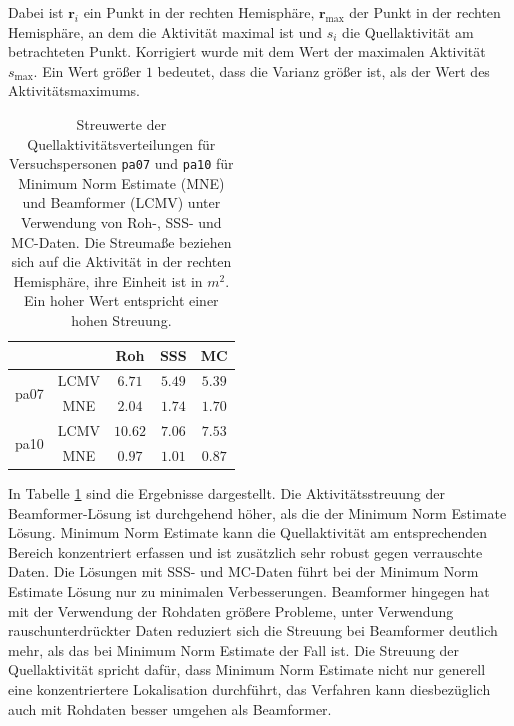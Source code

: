 \documentclass[doc,a4paper,12pt]{apa6}
\newcommand{\mx}[1]{\mathbf{#1}}
\renewcommand{\arraystretch}{1.2}
\begin{document}
Dabei ist $\mx{r}_i$ ein Punkt in der rechten Hemisphäre, $\mx{r}_{\text{max}}$ der Punkt in der rechten Hemisphäre, an dem die Aktivität maximal ist und $s_i$ die Quellaktivität am betrachteten Punkt. Korrigiert wurde mit dem Wert der maximalen Aktivität $s_{\text{max}}$. Ein Wert größer $1$ bedeutet, dass die Varianz größer ist, als der Wert des Aktivitätsmaximums.

\begin{table}[t]
  \caption{}
  \label{tab:distribution}
  \vspace*{3mm}
  \centering
  \setlength{\tabcolsep}{1cm}
  \renewcommand{\arraystretch}{1.5}
  \begin{tabular}{ccccc}
  \hline
  & & Roh & SSS & MC\\
  \hline
  \multirow{2}{*}{pa07} & LCMV & $6.71$ & $5.49$ & $5.39$\\
  & MNE & $2.04$ & $1.74$ & $1.70$\\
  \hline
  \multirow{2}{*}{pa10} & LCMV & $10.62$ & $7.06$ & $7.53$\\
  & MNE & $0.97$ & $1.01$ & $0.87$\\
  \hline
  \end{tabular}
  \vspace*{3mm}
  \caption*{Streuwerte der Quellaktivitätsverteilungen für Versuchspersonen \texttt{pa07} und \texttt{pa10} für Minimum Norm Estimate (MNE) und Beamformer (LCMV) unter Verwendung von Roh-, SSS- und MC-Daten. Die Streumaße beziehen sich auf die Aktivität in der rechten Hemisphäre, ihre Einheit ist in $m^2$. Ein hoher Wert entspricht einer hohen Streuung.}
\end{table}

In Tabelle \ref{tab:distribution} sind die Ergebnisse dargestellt. Die Aktivitätsstreuung der Beamformer-Lösung ist durchgehend höher, als die der Minimum Norm Estimate Lösung. Minimum Norm Estimate kann die Quellaktivität am entsprechenden Bereich konzentriert erfassen und ist zusätzlich sehr robust gegen verrauschte Daten. Die Lösungen mit SSS- und MC-Daten führt bei der Minimum Norm Estimate Lösung nur zu minimalen Verbesserungen. Beamformer hingegen hat mit der Verwendung der Rohdaten größere Probleme, unter Verwendung rauschunterdrückter Daten reduziert sich die Streuung bei Beamformer deutlich mehr, als das bei Minimum Norm Estimate der Fall ist. Die Streuung der Quellaktivität spricht dafür, dass Minimum Norm Estimate nicht nur generell eine konzentriertere Lokalisation durchführt, das Verfahren kann diesbezüglich auch mit Rohdaten besser umgehen als Beamformer.
\end{document}
